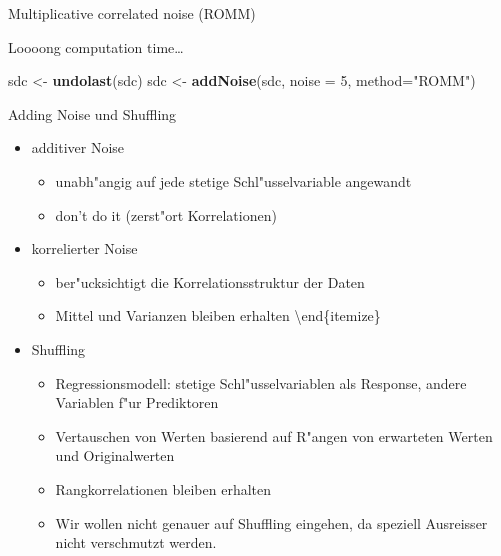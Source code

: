 \documentclass[ignorenonframetext,]{beamer}
\newenvironment{Shaded}{\begin{snugshade}}{\end{snugshade}}
\newcommand{\DataTypeTok}[1]{\textcolor[rgb]{0.13,0.29,0.53}{#1}}
\newcommand{\DecValTok}[1]{\textcolor[rgb]{0.00,0.00,0.81}{#1}}
\newcommand{\KeywordTok}[1]{\textcolor[rgb]{0.13,0.29,0.53}{\textbf{#1}}}
\newcommand{\NormalTok}[1]{#1}
\newcommand{\StringTok}[1]{\textcolor[rgb]{0.31,0.60,0.02}{#1}}
\providecommand{\tightlist}{%
  \setlength{\itemsep}{0pt}\setlength{\parskip}{0pt}}
\begin{document}
\begin{frame}[fragile]{Multiplicative correlated noise (ROMM)}
\protect\hypertarget{multiplicative-correlated-noise-romm}{}

Loooong computation time\ldots{}

\begin{Shaded}
\begin{Highlighting}[]
\NormalTok{sdc <-}\StringTok{ }\KeywordTok{undolast}\NormalTok{(sdc)}
\NormalTok{sdc <-}\StringTok{ }\KeywordTok{addNoise}\NormalTok{(sdc, }\DataTypeTok{noise =} \DecValTok{5}\NormalTok{, }\DataTypeTok{method=}\StringTok{"ROMM"}\NormalTok{)}
\end{Highlighting}
\end{Shaded}

\end{frame}

\begin{frame}{Adding Noise und Shuffling}
\protect\hypertarget{adding-noise-und-shuffling}{}

\begin{itemize}
\tightlist
\item
  additiver Noise

  \begin{itemize}
  \tightlist
  \item
    unabh"angig auf jede stetige Schl"usselvariable angewandt
  \item
    don't do it (zerst"ort Korrelationen)
  \end{itemize}
\item
  korrelierter Noise

  \begin{itemize}
  \tightlist
  \item
    ber"ucksichtigt die Korrelationsstruktur der Daten
  \item
    Mittel und Varianzen bleiben erhalten \textbackslash{}end\{itemize\}
  \end{itemize}
\item
  Shuffling

  \begin{itemize}
  \tightlist
  \item
    Regressionsmodell: stetige Schl"usselvariablen als Response, andere
    Variablen f"ur Prediktoren
  \item
    Vertauschen von Werten basierend auf R"angen von erwarteten Werten
    und Originalwerten
  \item
    Rangkorrelationen bleiben erhalten
  \item
    Wir wollen nicht genauer auf Shuffling eingehen, da speziell
    Ausreisser nicht verschmutzt werden.
  \end{itemize}
\end{itemize}

\end{frame}
\end{document}
